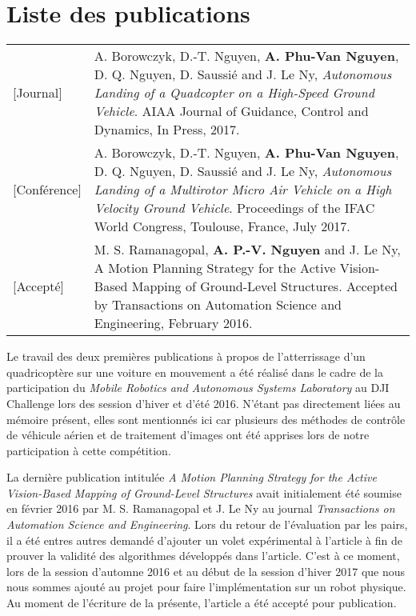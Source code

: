 \chapter*{Liste des publications}

\begin{longtable}{lp{5in}}
  [Journal]     & A. Borowczyk, D.-T. Nguyen, \textbf{A. Phu-Van Nguyen}, D. Q. Nguyen, D. Saussié and J. Le Ny, \textit{Autonomous Landing of a Quadcopter on a High-Speed Ground Vehicle}. AIAA Journal of Guidance, Control and Dynamics, In Press, 2017.\\

  [Conférence]  & A. Borowczyk, D.-T. Nguyen, \textbf{A. Phu-Van Nguyen}, D. Q. Nguyen, D. Saussié and J. Le Ny, \textit{Autonomous Landing of a Multirotor Micro Air Vehicle on a High Velocity Ground Vehicle}. Proceedings of the IFAC World Congress, Toulouse, France, July 2017.\\

  [Accepté]      & M. S. Ramanagopal, \textbf{A. P.-V. Nguyen} and J. Le Ny, A Motion Planning Strategy for the Active Vision-Based Mapping of Ground-Level Structures. Accepted by Transactions on Automation Science and Engineering, February 2016.
\end{longtable}

Le travail des deux premières publications à propos de l'atterrissage d'un quadricoptère sur une voiture en mouvement a été réalisé dans le cadre de la participation du \textit{Mobile Robotics and Autonomous Systems Laboratory} au DJI Challenge lors des session d'hiver et d'été 2016. N'étant pas directement liées au mémoire présent, elles sont mentionnés ici car plusieurs des méthodes de contrôle de véhicule aérien et de traitement d'images ont été apprises lors de notre participation à cette compétition.

La dernière publication intitulée \textit{A Motion Planning Strategy for the Active Vision-Based Mapping of Ground-Level Structures} avait initialement été soumise en février 2016 par M. S. Ramanagopal et J. Le Ny au journal \textit{Transactions on Automation Science and Engineering}. Lors du retour de l'évaluation par les pairs, il a été entres autres demandé d'ajouter un volet expérimental à l'article à fin de prouver la validité des algorithmes développés dans l'article. C'est à ce moment, lors de la session d'automne 2016 et au début de la session d'hiver 2017 que nous nous sommes ajouté au projet pour faire l'implémentation sur un robot physique. Au moment de l'écriture de la présente, l'article a été accepté pour publication.
